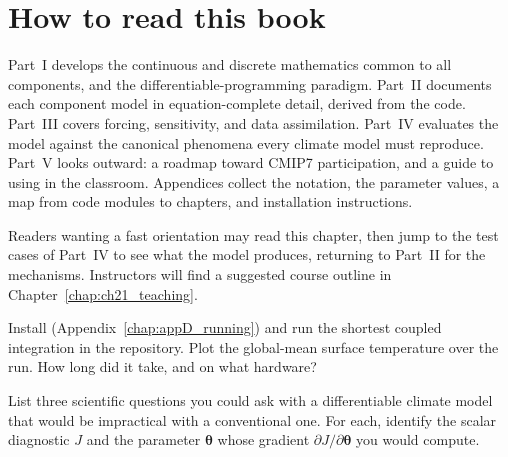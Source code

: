 \section{How to read this book}

Part~I develops the continuous and discrete mathematics common to all components, and the
differentiable-programming paradigm. Part~II documents each component model in
equation-complete detail, derived from the code. Part~III covers forcing, sensitivity, and data
assimilation. Part~IV evaluates the model against the canonical phenomena every climate model
must reproduce. Part~V looks outward: a roadmap toward CMIP7 participation, and a guide to using
\model{} in the classroom. Appendices collect the notation, the parameter values, a map from
code modules to chapters, and installation instructions.

Readers wanting a fast orientation may read this chapter, then jump to the test cases of
Part~IV to see what the model produces, returning to Part~II for the mechanisms. Instructors
will find a suggested course outline in Chapter~\ref{chap:ch21_teaching}.

\begin{exercise}
Install \model{} (Appendix~\ref{chap:appD_running}) and run the shortest coupled integration in
the repository. Plot the global-mean surface temperature over the run. How long did it take, and
on what hardware?
\end{exercise}

\begin{exercise}
List three scientific questions you could ask with a differentiable climate model that would be
impractical with a conventional one. For each, identify the scalar diagnostic $J$ and the
parameter $\boldsymbol{\theta}$ whose gradient $\partial J/\partial\boldsymbol{\theta}$ you would
compute.
\end{exercise}

